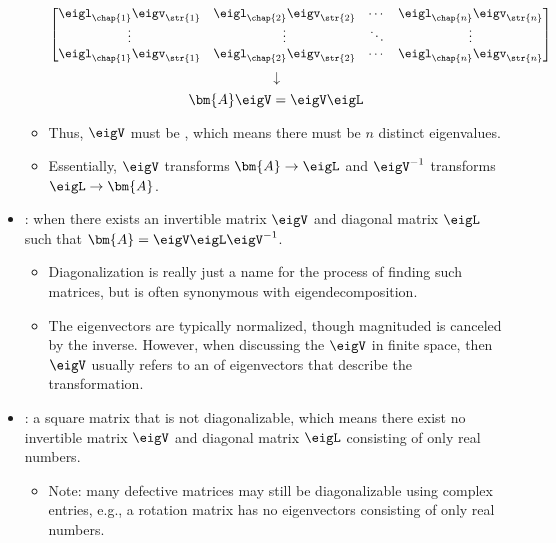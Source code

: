 \begin{itemize}
\begin{itemize}
\[\begin{bmatrix}
    \eigl_{\chap{1}} \eigv_{\str{1}} & \eigl_\chap{2} \eigv_\str{2} & \cdots & \eigl_\chap{n} \eigv_\str{n} \\
    \vdots & \vdots & \ddots & \vdots \\
    \eigl_{\chap{1}} \eigv_{\str{1}} & \eigl_\chap{2} \eigv_\str{2} & \cdots & \eigl_\chap{n} \eigv_\str{n}
    \end{bmatrix}
    \]%
    \[%
    \downarrow
    \]%
    \[%
    \bm{A}\eigV = \eigV \eigL 
    \]%
    \item Thus, \(\eigV \) must be \hyperref[Matrix Inverse]{}, which means there must be \(n\) distinct eigenvalues. 
    \item Essentially, \(\eigV \) transforms \(\bm{A}\to \eigL\) and \(\eigV ^{-1}\) transforms \(\eigL \to \bm{A}\).
  \end{itemize}
  \item {}: when there exists an invertible matrix \(\eigV\) and diagonal matrix \(\eigL\) such that \(\bm{A} = \eigV \eigL \eigV ^{-1}\).
    \begin{itemize}
      \item Diagonalization is really just a name for the process of finding such matrices, but is often synonymous with eigendecomposition.
      \item The eigenvectors are typically normalized, though magnituded is canceled by the inverse. However, when discussing the \(\eigV\) in finite space, then \(\eigV \) usually refers to an \hyperref[Basis]{} of eigenvectors that describe the transformation.
    \end{itemize}
  \item {}: a square matrix that is not diagonalizable, which means there exist no invertible matrix \(\eigV\) and diagonal matrix \(\eigL \) consisting of only real numbers.
    \begin{itemize}
      \item Note: many defective matrices may still be diagonalizable using complex entries, e.g., a rotation matrix has no eigenvectors consisting of only real numbers.
    \end{itemize}

\end{itemize}
